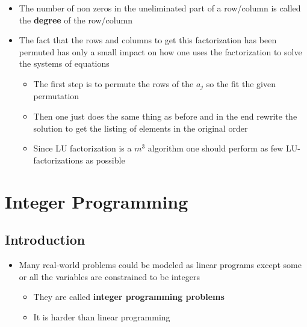 \documentclass[11pt]{article}
\begin{document}
\begin{itemize}
\item The number of non zeros in the uneliminated part of a row/column is called the \textbf{degree} of the row/column
\item The fact that the rows and columns to get this factorization has been permuted has only a small impact on how one uses the factorization to solve the systems of equations
\begin{itemize}
\item The first step is to permute the rows of the \(a_j\) so the fit the given permutation
\item Then one just does the same thing as before and in the end rewrite the solution to get the listing of elements in the original order
\item Since LU factorization is a \(m^3\) algorithm one should perform as few LU-factorizations as possible
\end{itemize}
\end{itemize}

\section{Integer Programming}
\label{sec:org38f33c3}
\subsection{Introduction}
\label{sec:org3060218}
\begin{itemize}
\item Many real-world problems could be modeled as linear programs except some or all the variables are constrained to be integers
\begin{itemize}
\item They are called \textbf{integer programming problems}
\item It is harder than linear programming
\end{itemize}
\end{itemize}
\end{document}
